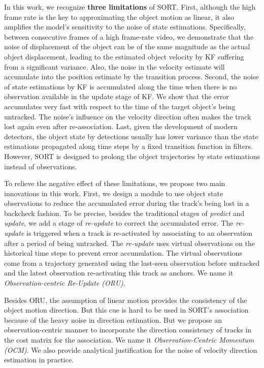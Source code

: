 \documentclass[10pt,twocolumn,letterpaper]{article}
\begin{document}
In this work, we recognize \textbf{three limitations} of SORT.
First, although the high frame rate is the key to approximating the object motion as linear, it also amplifies the model's sensitivity to the noise of state estimations. Specifically, between consecutive frames of a high frame-rate video, we demonstrate that the noise of displacement of the object can be of the same magnitude as the actual object displacement, leading to the estimated object velocity by KF suffering from a significant variance. Also, the noise in the velocity estimate will accumulate into the position estimate by the transition process.
Second, the noise of state estimations by KF is accumulated along the time when there is no observation available in the update stage of KF. We show that the error accumulates very fast with respect to the time of the target object's being untracked.
The noise's influence on the velocity direction often makes the track lost again even after re-association.
Last, given the development of modern detectors, the object state by detections usually has lower variance than the state estimations propagated along time steps by a fixed transition function in filters. However, SORT is designed to prolong the object trajectories by state estimations instead of observations.

To relieve the negative effect of these limitations, we propose two main innovations in this work. First, we design a module to use object state observations to reduce the accumulated error during the track's being lost in a backcheck fashion. To be precise, besides the traditional stages of \textit{predict} and \textit{update}, we add a stage of \textit{re-update} to correct the accumulated error. The \textit{re-update} is triggered when a track is re-activated by associating to an observation after a period of being untracked. The \textit{re-update} uses virtual observations on the historical time steps to prevent error accumulation. The virtual observations come from a trajectory generated using the last-seen observation before untracked and the latest observation re-activating this track as anchors. We name it \textit{Observation-centric Re-Update (ORU)}. 


Besides ORU, the assumption of linear motion provides the consistency of the object motion direction. But this cue is hard to be used in SORT's association because of the heavy noise in direction estimation. But we propose an observation-centric manner to incorporate the direction consistency of tracks in the cost matrix for the association. We name it \textit{Observation-Centric Momentum (OCM)}. We also provide analytical justification for the noise of velocity direction estimation in practice.
\end{document}
